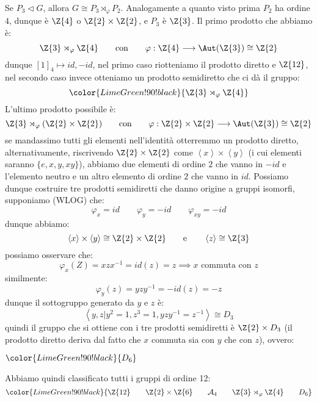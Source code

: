\documentclass[11pt]{scrartcl}
\begin{document}
\begin{example}
    Se $P_3 \triangleleft G$, allora $G \cong P_3 \rtimes_{\varphi} P_2$. Analogamente a quanto visto prima $P_2$ ha ordine $4$, dunque è $\Z{4}$ o $\Z{2} \times \Z{2}$, e $P_3$ è $\Z{3}$.
    Il primo prodotto che abbiamo è:
        \[ \Z{3} \rtimes_{\varphi} \Z{4} \qquad \text{con} \qquad \varphi : \Z{4} \longrightarrow \Aut(\Z{3}) \cong \Z{2}
            \]
    dunque $[1]_4 \longmapsto id,-id$, nel primo caso riotteniamo il prodotto diretto e $\Z{12}$, nel secondo caso invece otteniamo un prodotto semidiretto che ci dà il gruppo:
        \[ \color{LimeGreen!90!black}{\Z{3} \rtimes_{\varphi} \Z{4}}
            \]
    L'ultimo prodotto possibile è:
        \[ \Z{3} \rtimes_{\varphi} (\Z{2} \times \Z{2}) \qquad \text{con} \qquad \varphi : \Z{2} \times \Z{2} \longrightarrow \Aut(\Z{3}) \cong \Z{2}
            \]
    se mandassimo tutti gli elementi nell'identità otterremmo un prodotto diretto, alternativamente, riscrivendo $\Z{2} \times \Z{2}$ come $\left<x\right> \times \left<y\right>$ (i cui elementi saranno $\{e,x,y,xy\}$), 
    abbiamo due elementi di ordine $2$ che vanno in $-id$ e l'elemento neutro e un altro elemento di ordine $2$ che vanno in $id$. Possiamo dunque costruire tre prodotti semidiretti che danno 
    origine a gruppi isomorfi, supponiamo (WLOG) che:
        \[ \varphi_x = id \qquad \varphi_y = -id \qquad \varphi_{xy} = -id
            \]
    dunque abbiamo:
        \[ \left<x\right> \times \left<y\right> \cong \Z{2} \times \Z{2} \qquad \text e \qquad \left<z\right> \cong \Z{3}
            \]
    possiamo osservare che:
        \[ \varphi_{x}(Z) = xzx^{-1} = id(z) = z \implies \text{$x$ commuta con $z$}
            \]
    similmente:
        \[ \varphi_{y}(z) = yzy^{-1} = -id(z) = -z
            \]
    dunque il sottogruppo generato da $y$ e $z$ è:
        \[ \left<y,z | y^2 = 1, z^3 = 1, yzy^{-1} = z^{-1}\right> \cong D_3
            \]
    quindi il gruppo che si ottiene con i tre prodotti semidiretti è $\Z{2} \times D_3$ (il prodotto diretto deriva
    dal fatto che $x$ commuta sia con $y$ che con $z$), ovvero:
        \begin{center}
            $\color{LimeGreen!90!black}{D_6}$
        \end{center}
\end{example}

Abbiamo quindi classificato tutti i gruppi di ordine 12:
    \[ \color{LimeGreen!90!black}{\Z{12} \qquad \Z{2} \times \Z{6} \qquad \mathcal{A}_4 \qquad \Z{3} \rtimes_{\varphi} \Z{4} \qquad D_6}
        \]
\end{document}
